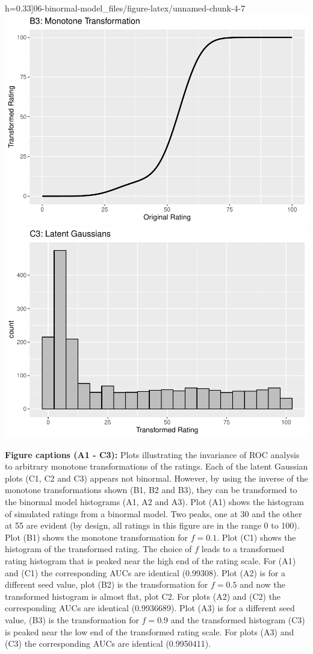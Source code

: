 \documentclass[
]{book}
\begin{document}
h=0.33\linewidth]{06-binormal-model_files/figure-latex/unnamed-chunk-4-7} \includegraphics[width=0.33\linewidth]{06-binormal-model_files/figure-latex/unnamed-chunk-4-8} \includegraphics[width=0.33\linewidth]{06-binormal-model_files/figure-latex/unnamed-chunk-4-9}

\textbf{Figure captions (A1 - C3):} Plots illustrating the invariance of ROC analysis to arbitrary monotone transformations of the ratings. Each of the latent Gaussian plots (C1, C2 and C3) appears not binormal. However, by using the inverse of the monotone transformations shown (B1, B2 and B3), they can be transformed to the binormal model histograms (A1, A2 and A3). Plot (A1) shows the histogram of simulated ratings from a binormal model. Two peaks, one at 30 and the other at 55 are evident (by design, all ratings in this figure are in the range 0 to 100). Plot (B1) shows the monotone transformation for \(f = 0.1\). Plot (C1) shows the histogram of the transformed rating. The choice of \(f\) leads to a transformed rating histogram that is peaked near the high end of the rating scale. For (A1) and (C1) the corresponding AUCs are identical (0.99308). Plot (A2) is for a different seed value, plot (B2) is the transformation for \(f = 0.5\) and now the transformed histogram is almost flat, plot C2. For plots (A2) and (C2) the corresponding AUCs are identical (0.9936689). Plot (A3) is for a different seed value, (B3) is the transformation for \(f = 0.9\) and the transformed histogram (C3) is peaked near the low end of the transformed rating scale. For plots (A3) and (C3) the corresponding AUCs are identical (0.9950411).
\end{document}
